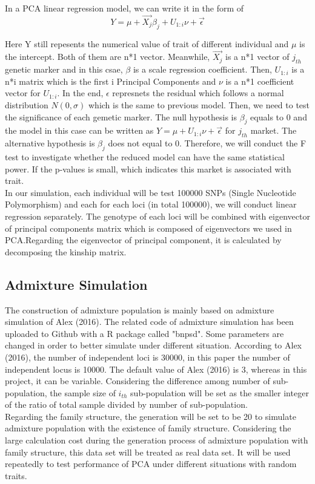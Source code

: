 \documentclass[12pt]{article}
\begin{document}
In a PCA linear regression model, we can write it in the form of $$Y=\mu+ \vec{X_{j}} {\beta}_{j}+U_{1:i} \nu+\vec{\epsilon}$$

Here Y still repesents the numerical value of trait of different individual and $\mu$ is the intercept. Both of them are n*1 vector. Meanwhile, $\vec{X_{j}}$ is a n*1 vector of $j_{th}$ genetic marker and in this csae, $\beta$ is a scale regression coefficient. Then, $U_{1:i}$ is a n*i matrix which is the first i Principal Components and $\nu$ is a n*1 coefficient vector for $U_{1:i}$. In the end, $\epsilon$ represnets the residual which follows a normal distribution $N(0,\sigma)$ which is the same to previous model. Then, we need to test the significance of each gemetic marker. The null hypothesis is ${\beta}_{j}$ equals to 0 and the model in this case can be written as $Y=\mu+U_{1:i} \nu+\vec{\epsilon}$ for $j_{th}$ market. The alternative hypothesis is ${\beta}_{j}$ does not equal to 0. Therefore, we will conduct the F test to investigate whether the reduced model can have the same statistical power. If the p-values is small, which indicates this market is associated with trait.\\

In our simulation, each individual will be test 100000 SNPs (Single Nucleotide Polymorphism) and each for each loci (in total 100000), we will conduct linear regression separately.  The genotype of each loci will be combined with eigenvector of principal components matrix which is composed of eigenvectors we used in PCA.Regarding the eigenvector of principal component, it is calculated by decomposing the kinship matrix.  

\subsection{Admixture Simulation}
The construction of admixture population is mainly based on admixture simulation of Alex (2016). The related code of admixture simulation has been uploaded to Github with a R package called "bnpsd".  Some parameters are changed in order to better simulate under different situation. According to Alex (2016), the number of independent loci is 30000, in this paper the number of independent locus is 10000. The default value of Alex (2016) is 3, whereas in this project, it can be variable. Considering the difference among number of sub-population, the sample size of $i_{th}$ sub-population will be set as the smaller integer of the ratio of total sample divided by number of sub-population.\\
Regarding the family structure, the generation will be set to be 20 to simulate admixture population with the existence of family structure. Considering the large calculation cost during the generation process of admixture population with family structure, this data set will be treated as real data set. It will be used repeatedly to test performance of PCA under different situations with random traits.
\end{document}
